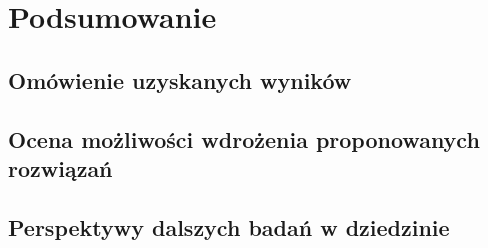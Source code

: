 \chapter*{Podsumowanie}
\section*{Omówienie uzyskanych wyników}
\section*{Ocena możliwości wdrożenia proponowanych rozwiązań}
\section*{Perspektywy dalszych badań w dziedzinie}


\listoffigures

\listoftables

